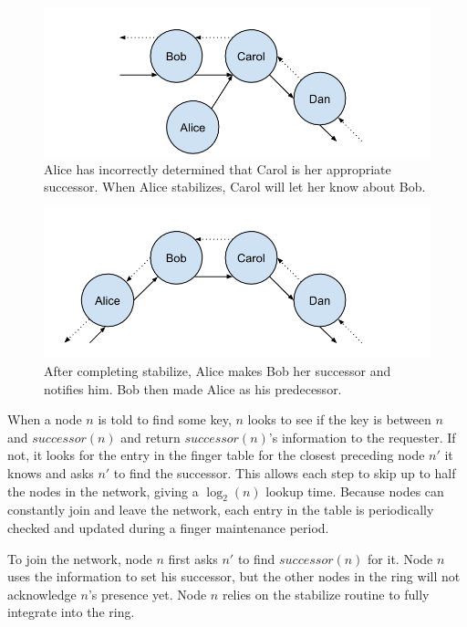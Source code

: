 \begin{figure}
	\includegraphics[width=\linewidth]{figs/abcd1}
	\caption{Alice has incorrectly determined that Carol is her appropriate successor.  When Alice stabilizes, Carol will let her know about Bob.}
	\label{fig:abcd1}
\end{figure}


\begin{figure}
	\includegraphics[width=\linewidth]{figs/abcd2}
	\caption{After completing stabilize, Alice makes Bob her successor and notifies him. Bob then made Alice as his predecessor.}
	\label{fig:abcd2}
\end{figure}



When a node $n$ is told to find some key, $n$ looks to see if the key is between $n$ and $successor(n)$ and return $successor(n)$'s information to the requester. 
If not, it looks for the entry in the finger table for the closest preceding node $n'$ it knows and asks $n'$ to find the successor.
This allows each step to skip up to half the nodes in the network, giving a $\log_2(n)$ lookup time.
Because nodes can constantly join and leave the network, each entry in the table is periodically checked and updated during a finger maintenance period. 

To join the network, node $n$ first asks $n'$ to find $successor(n)$ for it.  
Node $n$ uses the information to set his successor, but the other nodes in the ring will not acknowledge $n$'s presence yet.  
Node $n$ relies on the stabilize routine to fully integrate into the ring.

